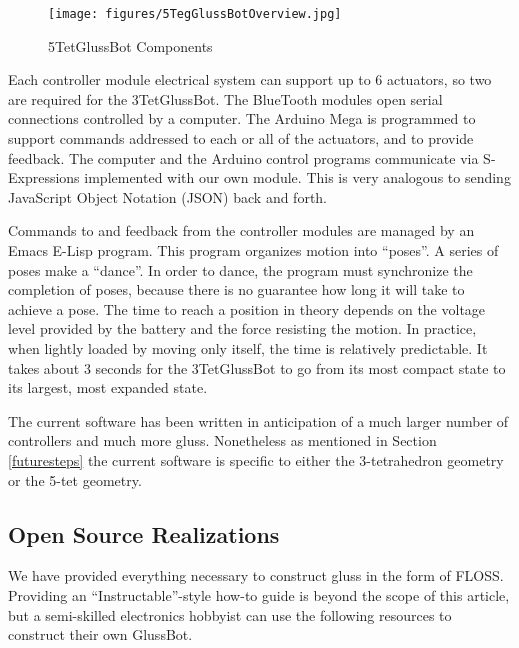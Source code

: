 \documentclass[11pt]{article}
\begin{document}
\begin{figure}[H]
  \centering
    \texttt{[image: figures/5TegGlussBotOverview.jpg]}
    \caption[5TetGlussBot Components]{5TetGlussBot Components}
      \label{5TetGlussBot}
\end{figure}


Each controller module electrical system can support up to 6 actuators, so two are required for the 3TetGlussBot.
The BlueTooth modules open serial connections controlled by a computer.
The Arduino Mega is programmed to support commands addressed to each or all of the actuators, and
to provide feedback. The computer and the Arduino control programs communicate via S-Expressions
implemented with our own module. This is very analogous to sending JavaScript Object Notation (JSON) back and forth.

Commands to and feedback from the controller modules are managed by an Emacs E-Lisp program.
This program organizes motion into ``poses''. A series of poses make a ``dance''.
In order to dance, the program must synchronize the completion of poses, because there is no
guarantee how long it will take to achieve a pose. The time to reach a position in theory
depends on the voltage level provided by the battery and the force resisting the motion.
In practice, when lightly loaded by moving only itself, the time is relatively predictable. It takes
about 3 seconds for the 3TetGlussBot to go from its most compact state to its largest, most expanded state.

The current software has been written in anticipation of a much larger number of controllers and much more gluss.
Nonetheless as mentioned in Section \ref{futuresteps} the current software is specific to either the 3-tetrahedron geometry or the
5-tet geometry.


\subsection{Open Source Realizations}

We have provided everything necessary to construct gluss in the form of FLOSS. Providing an ``Instructable''-style
how-to guide is beyond the scope of this article, but a semi-skilled electronics hobbyist can use the
following resources to construct their own GlussBot.
\end{document}
